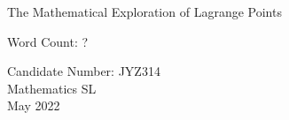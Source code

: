 \begin{titlepage}
	\begin{center}
		\vspace*{\fill}
		
		The Mathematical Exploration of Lagrange Points
		
		\vspace*{1.0cm}
		Word Count: ?
		
		\vfill
		
		Candidate Number: JYZ314\\
		Mathematics SL \\
		May 2022
		
		\vspace*{\fill}
		
	\end{center}
\end{titlepage}
